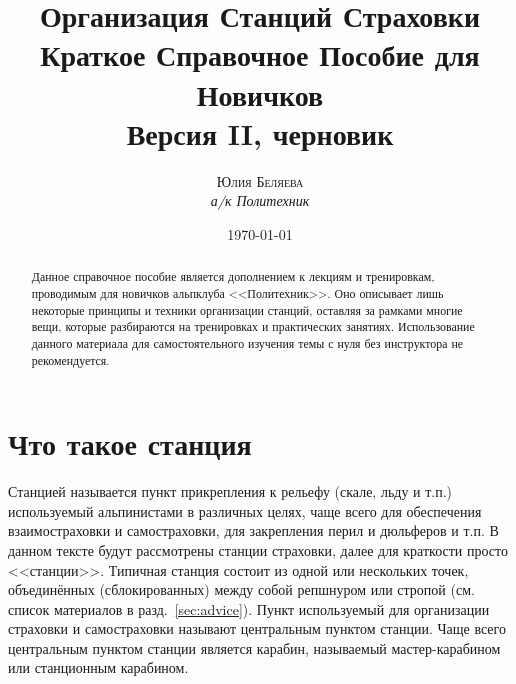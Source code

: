 \documentclass[fleqn, 12pt]{extarticle}
\begin{document}

\title{\textbf{Организация Станций Страховки}\\
\large{Краткое Справочное Пособие для Новичков}\\
\small{Версия II, черновик}}
\author{\textsc{Юлия Беляева}\\\textit{а/к Политехник}}
\date{\today}

\maketitle

\begin{abstract}
	Данное справочное пособие является дополнением к лекциям и тренировкам, проводимым для новичков альпклуба <<Политехник>>. Оно описывает лишь некоторые принципы и техники организации станций,
	оставляя за рамками многие вещи, которые разбираются на тренировках и практических занятиях. Использование данного материала для самостоятельного изучения темы с нуля без инструктора не
	рекомендуется.
\end{abstract}

\section{Что такое станция}
Станцией называется пункт прикрепления к рельефу (скале, льду и т.п.) используемый альпинистами в различных целях, чаще всего для обеспечения взаимостраховки и самостраховки, для
закрепления перил и дюльферов и т.п. В данном тексте будут рассмотрены станции страховки, далее для краткости просто <<станции>>. Типичная станция состоит из одной или нескольких точек,
объединённых (сблокированных) между собой репшнуром или стропой (см. список материалов в разд.~\ref{sec:advice}). Пункт используемый для организации страховки и
самостраховки называют центральным пунктом станции.
Чаще всего центральным пунктом станции является карабин, называемый мастер-карабином или станционным карабином.
\end{document}
